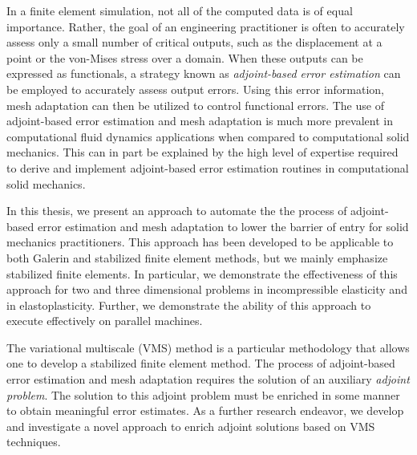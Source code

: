 
In a finite element simulation, not all of the computed
data is of equal importance. Rather, the goal of an engineering
practitioner is often to accurately assess only a small
number of critical outputs, such as the displacement
at a point or the von-Mises stress over a domain. When
these outputs can be expressed as functionals,
a strategy known as \emph{adjoint-based error estimation}
can be employed to accurately assess output errors.
Using this error information, mesh adaptation can then
be utilized to control functional errors.
The use of adjoint-based error estimation and mesh adaptation
is much more prevalent in computational fluid dynamics
applications when compared to computational solid mechanics.
This can in part be explained by the high level of expertise
required to derive and implement adjoint-based error estimation
routines in computational solid mechanics.

In this thesis, we present an approach to automate the
the process of adjoint-based error estimation and mesh
adaptation to lower the barrier of entry for solid
mechanics practitioners. This approach has been developed
to be applicable to both Galerin and stabilized finite
element methods, but we mainly emphasize stabilized finite
elements. In particular, we demonstrate the
effectiveness of this approach for two and three
dimensional problems in incompressible elasticity and
in elastoplasticity. Further, we demonstrate the ability
of this approach to execute effectively on parallel
machines.

The variational multiscale (VMS) method is a particular
methodology that allows one to develop a stabilized
finite element method.
The process of adjoint-based error estimation and mesh
adaptation requires the solution of an auxiliary
\emph{adjoint problem}. The solution to this adjoint problem
must be enriched in some manner to obtain meaningful error
estimates. As a further research endeavor, we develop and
investigate a novel approach to enrich adjoint solutions
based on VMS techniques.
